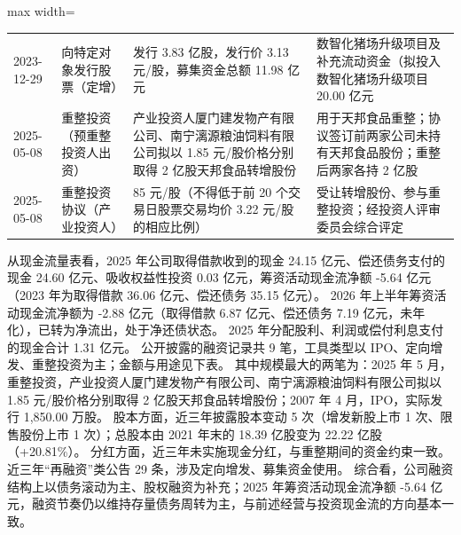 \begin{center}
\begin{adjustbox}{max width=\textwidth}
\begin{tabular}{@{}p{1.45cm}p{2.55cm}p{4.05cm}p{4.95cm}@{}}
2023-12-29 & 向特定对象发行股票（定增） & 发行 3.83 亿股，\allowbreak{}发行价 3.13 元/\allowbreak{}股，\allowbreak{}募集资金总额 11.98 亿元 & 数智化猪场升级项目及补充流动资金（拟投入数智化猪场升级项目 20.00 亿元 \\
2025-05-08 & 重整投资（预重整投资人出资） & 产业投资人厦门建发物产有限公司、\allowbreak{}南宁漓源粮油饲料有限公司拟以 1.85 元/\allowbreak{}股价格分别取得 2 亿股天邦食品转增股份 & 用于天邦食品重整；协议签订前两家公司未持有天邦食品股份；重整后两家各持 2 亿股 \\
2025-05-08 & 重整投资协议（产业投资人） & 85 元/\allowbreak{}股（不得低于前 20 个交易日股票交易均价 3.22 元/\allowbreak{}股的相应比例） & 受让转增股份、\allowbreak{}参与重整投资；经投资人评审委员会综合评定 \\
\bottomrule
\end{tabular}
\end{adjustbox}
\end{center}

 从现金流量表看，2025 年公司取得借款收到的现金 24.15 亿元、偿还债务支付的现金 24.60 亿元、吸收权益性投资 0.03 亿元，筹资活动现金流净额 -5.64 亿元（2023 年为取得借款 36.06 亿元、偿还债务 35.15 亿元）。 2026 年上半年筹资活动现金流净额为 -2.88 亿元（取得借款 6.87 亿元、偿还债务 7.19 亿元，未年化），已转为净流出，处于净还债状态。 2025 年分配股利、利润或偿付利息支付的现金合计 1.31 亿元。 公开披露的融资记录共 9 笔，工具类型以 IPO、定向增发、重整投资为主；金额与用途见下表。 其中规模最大的两笔为：2025 年 5 月，重整投资，产业投资人厦门建发物产有限公司、南宁漓源粮油饲料有限公司拟以 1.85 元/股价格分别取得 2 亿股天邦食品转增股份；2007 年 4 月，IPO，实际发行 1,850.00 万股。 股本方面，近三年披露股本变动 5 次（增发新股上市 1 次、限售股份上市 1 次）；总股本由 2021 年末的 18.39 亿股变为 22.22 亿股（+20.81\%）。 分红方面，近三年未实施现金分红，与重整期间的资金约束一致。 近三年“再融资”类公告 29 条，涉及定向增发、募集资金使用。 综合看，公司融资结构上以债务滚动为主、股权融资为补充；2025 年筹资活动现金流净额 -5.64 亿元，融资节奏仍以维持存量债务周转为主，与前述经营与投资现金流的方向基本一致。

